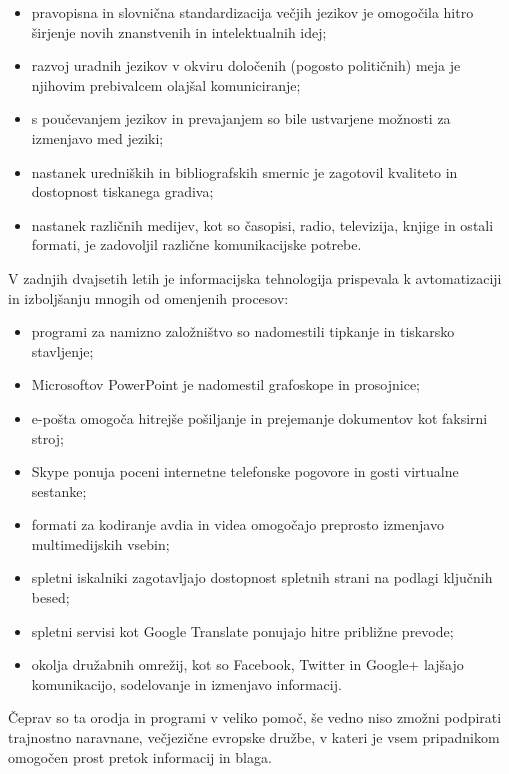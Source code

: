 \begin{multicols}{2}
\medskip
\begin{itemize}
\item pravopisna in slovnična standardizacija večjih jezikov je omogočila hitro širjenje novih znanstvenih in intelektualnih idej;
\item razvoj uradnih jezikov v okviru določenih (pogosto političnih) meja je njihovim prebivalcem olajšal komuniciranje;
\item s poučevanjem jezikov in prevajanjem so bile ustvarjene možnosti za izmenjavo med jeziki;
\item nastanek uredniških in bibliografskih smernic je zagotovil kvaliteto in dostopnost tiskanega gradiva;
\medskip
\item nastanek različnih medijev, kot so časopisi, radio, televizija, knjige in ostali formati, je zadovoljil različne komunikacij\-ske potrebe.
\end{itemize}
\vspace*{-0.009 cm}
V zadnjih dvajsetih letih je informacij\-ska tehnologija prispevala k avtomatizaciji in izboljšanju mnogih od omenjenih procesov:
\vspace*{-0.009 cm}
\begin{itemize}
\item programi za namizno založništvo so nadomestili tipkanje in tiskarsko stav\-ljenje;
\item Microsoftov PowerPoint je nadomestil grafo\-skope in prosojnice;
\item e-pošta omogoča hitrejše pošiljanje in prejemanje dokumentov kot faksirni stroj;
\item Skype ponuja poceni internetne telefonske pogo\-vore in gosti virtualne sestanke;
\item formati za kodiranje avdia in videa omogočajo preprosto izmenjavo multimedijskih vsebin;
\item spletni iskalniki zagotav\-ljajo dostopnost spletnih strani na podlagi ključnih besed;
\item spletni servisi kot Google Translate ponujajo hitre približne prevode;
\item okolja družabnih omrežij, kot so Facebook, Twitter in Google+ lajšajo komunikacijo, sodelovanje in izmenjavo informacij.
\end{itemize}

Čeprav so ta orodja in programi v veliko pomoč, še vedno niso zmožni podpirati trajnostno naravnane, večjezične evropske družbe, v kateri je vsem pripadnikom omogočen prost pretok informacij in blaga.


\end{multicols}
